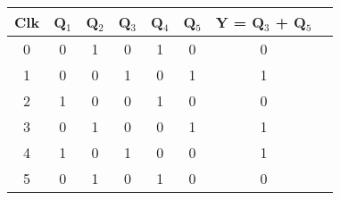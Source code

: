 \renewcommand{\arraystretch}{3.5}
\begin{tabular}{|c|c|c|c|c|c|c|c|}
\hline
\textbf{Clk}             & \textbf{Q$_1$} & \textbf{Q$_2$} & \textbf{Q$_3$} & \textbf{Q$_4$} & \textbf{Q$_5$} & \textbf{Y = Q$_3$ + Q$_5$} \\ \hline
{\color[HTML]{6200C9} 0} & 0              & 1              & 0              & 1              & 0              & 0                          \\ 
{\color[HTML]{6200C9} 1} & 0              & 0              & 1              & 0              & 1              & 1                          \\ 
{\color[HTML]{6200C9} 2} & 1              & 0              & 0              & 1              & 0              & 0                          \\ 
{\color[HTML]{6200C9} 3} & 0              & 1              & 0              & 0              & 1              & 1                          \\ 
{\color[HTML]{6200C9} 4} & 1              & 0              & 1              & 0              & 0              & 1                          \\ 
{\color[HTML]{6200C9} 5} & 0              & 1              & 0              & 1              & 0              & 0                          \\ \hline
\end{tabular}